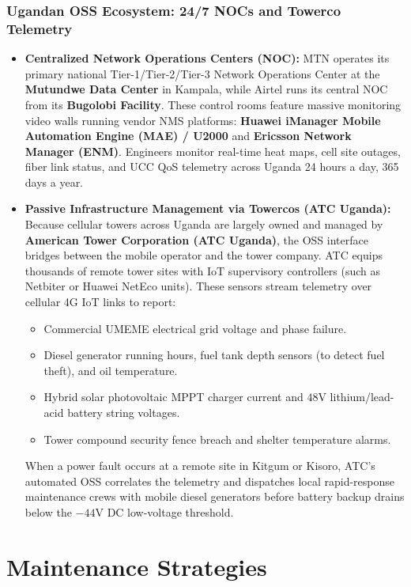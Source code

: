 \documentclass[12pt,a4paper]{report}
\begin{document}
\subsection{Ugandan OSS Ecosystem: 24/7 NOCs and Towerco Telemetry}
\begin{itemize}
    \item \textbf{Centralized Network Operations Centers (NOC):}
    MTN operates its primary national Tier-1/Tier-2/Tier-3 Network Operations Center at the \textbf{Mutundwe Data Center} in Kampala, while Airtel runs its central NOC from its \textbf{Bugolobi Facility}. These control rooms feature massive monitoring video walls running vendor NMS platforms: \textbf{Huawei iManager Mobile Automation Engine (MAE) / U2000} and \textbf{Ericsson Network Manager (ENM)}. Engineers monitor real-time heat maps, cell site outages, fiber link status, and UCC QoS telemetry across Uganda 24 hours a day, 365 days a year.
    
    \item \textbf{Passive Infrastructure Management via Towercos (ATC Uganda):}
    Because cellular towers across Uganda are largely owned and managed by \textbf{American Tower Corporation (ATC Uganda)}, the OSS interface bridges between the mobile operator and the tower company. ATC equips thousands of remote tower sites with IoT supervisory controllers (such as Netbiter or Huawei NetEco units). These sensors stream telemetry over cellular 4G IoT links to report:
    \begin{itemize}
        \item Commercial UMEME electrical grid voltage and phase failure.
        \item Diesel generator running hours, fuel tank depth sensors (to detect fuel theft), and oil temperature.
        \item Hybrid solar photovoltaic MPPT charger current and $48\text{V}$ lithium/lead-acid battery string voltages.
        \item Tower compound security fence breach and shelter temperature alarms.
    \end{itemize}
    When a power fault occurs at a remote site in Kitgum or Kisoro, ATC's automated OSS correlates the telemetry and dispatches local rapid-response maintenance crews with mobile diesel generators before battery backup drains below the $-44\text{V DC}$ low-voltage threshold.
\end{itemize}

\chapter{Maintenance Strategies}
\end{document}
